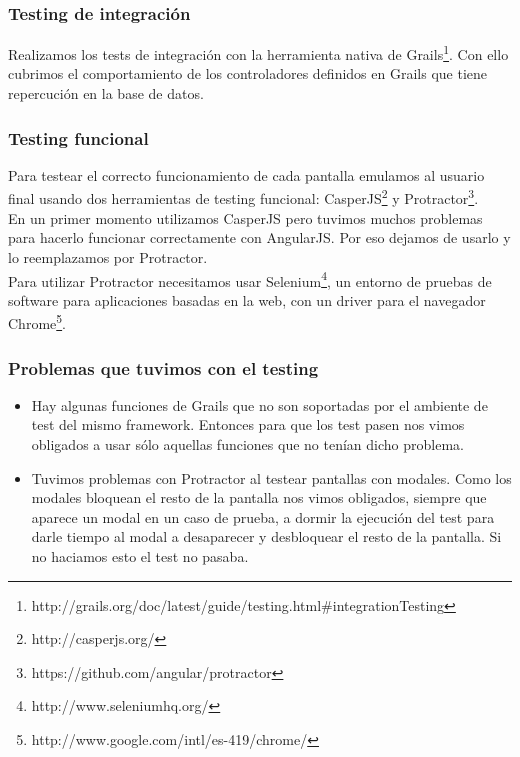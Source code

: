 \subsubsection{Testing de integración}
Realizamos los tests de integración con la herramienta nativa de Grails\footnote{http://grails.org/doc/latest/guide/testing.html\#integrationTesting}. Con ello cubrimos el comportamiento de los controladores definidos en Grails que tiene repercución en la base de datos.

\subsubsection{Testing funcional}
Para testear el correcto funcionamiento de cada pantalla emulamos al usuario final usando dos herramientas de testing funcional: CasperJS\footnote{http://casperjs.org/} y Protractor\footnote{https://github.com/angular/protractor}.\\
En un primer momento utilizamos CasperJS pero tuvimos muchos problemas para hacerlo funcionar correctamente con AngularJS. Por eso dejamos de usarlo y lo reemplazamos por Protractor.\\
Para utilizar Protractor necesitamos usar Selenium\footnote{http://www.seleniumhq.org/}, un entorno de pruebas de software para aplicaciones basadas en la web, con un driver para el navegador  Chrome\footnote{http://www.google.com/intl/es-419/chrome/}.

\subsubsection{Problemas que tuvimos con el testing}
\begin{itemize}
\item Hay algunas funciones de Grails que no son soportadas por el ambiente de test del mismo framework. Entonces para que los test pasen nos vimos obligados a usar sólo aquellas funciones que no tenían dicho problema.
\item Tuvimos problemas con Protractor al testear pantallas con modales. Como los modales bloquean el resto de la pantalla nos vimos obligados, siempre que aparece un modal en un caso de prueba, a dormir la ejecución del test para darle tiempo al modal a desaparecer y desbloquear el resto de la pantalla. Si no haciamos esto el test no pasaba.
\end{itemize}

